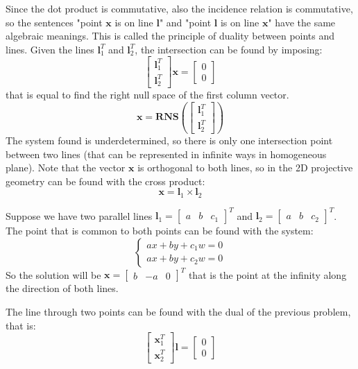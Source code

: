 \documentclass[12pt, a4paper]{report}
\newtheorem[style=M,bodystyle=\normalfont]{theorem}{Theorem}
\newtheorem[style=M,bodystyle=\normalfont]{corollary}{Corollary}
\newtheorem[style=M,bodystyle=\normalfont]{lemma}{Lemma}
\newtheorem[style=M,bodystyle=\normalfont]{definition}{Definition}
\begin{document}
    Since the dot product is commutative, also the incidence relation is commutative, so the sentences "point $\textbf{x}$ is on line $\textbf{l}$" and "point $\textbf{l}$ is 
    on line $\textbf{x}$" have the same algebraic meanings. This is called the principle of duality between points and lines. 
    Given the lines $\textbf{l}_1^T$ and $\textbf{l}_2^T$, the intersection can be found by imposing: 
    \[\begin{bmatrix} \textbf{l}_1^T \\ \textbf{l}_2^T \end{bmatrix} \textbf{x} = \begin{bmatrix} 0 \\ 0 \end{bmatrix}\]
    that is equal to find the right null space of the first column vector. 
    \[\textbf{x}=\textbf{RNS}\left( \begin{bmatrix} \textbf{l}_1^T \\ \textbf{l}_2^T \end{bmatrix} \right)\]
    The system found is underdetermined, so there is only one intersection point between two lines (that can be represented in infinite ways in homogeneous plane). Note that the 
    vector $\textbf{x}$ is orthogonal to both lines, so in the 2D projective geometry can be found with the cross product: 
    \[\textbf{x}=\textbf{l}_1 \times \textbf{l}_2\]
    \begin{example}
        Suppose we have two parallel lines $\textbf{l}_1={\begin{bmatrix} a & b & c_1 \end{bmatrix}}^T$ and 
        $\textbf{l}_2={\begin{bmatrix} a & b & c_2 \end{bmatrix}}^T$. The point that is common to both points can be found with the system: 
        \[
            \begin{cases}
                ax+by+c_1w=0 \\
                ax+by+c_2w=0
            \end{cases}
        \]
        So the solution will be ${\textbf{x}=\begin{bmatrix} b & -a & 0 \end{bmatrix}}^T$ that is the point at the infinity along the direction of both lines. 
    \end{example}
    The line through two points can be found with the dual of the previous problem, that is: 
    \[\begin{bmatrix} \textbf{x}_1^T \\ \textbf{x}_2^T \end{bmatrix} \textbf{l} = \begin{bmatrix} 0 \\ 0 \end{bmatrix}\]
\end{document}
